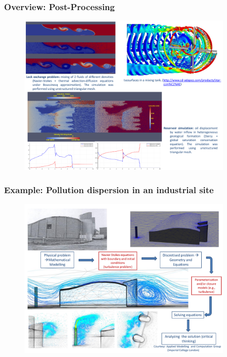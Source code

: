 \documentclass[10pt,compress,handout,ignorenonframetext]{beamer}
\begin{document}
\begin{frame}
 \frametitle{Overview: Post-Processing}

   \begin{figure}%
    \begin{center}
     \includegraphics[width=12.cm, height=7.8cm, clip]{./Figs/PostProcessingExamples.pdf}
    \end{center}
   \end{figure}    

\end{frame}

\begin{frame}
 \frametitle{Example: Pollution dispersion in an industrial site}

   \begin{figure}%
    \begin{center}
     \includegraphics[width=12.cm, height=7.8cm, clip]{./Figs/SpecificIndustrialEnvironmentalApplication.pdf}
    \end{center}
   \end{figure}    

\end{frame}
\end{document}
